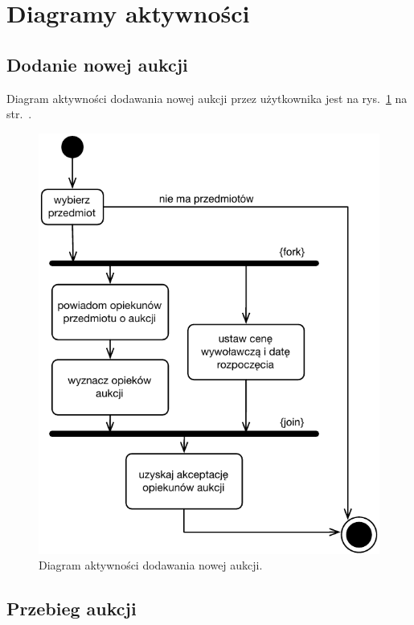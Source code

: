 \documentclass[10pt,a4paper]{article}
\begin{document}
\newpage
\section{Diagramy aktywności}

\subsection{Dodanie nowej aukcji}

Diagram aktywności dodawania nowej aukcji przez użytkownika jest na
rys.~\ref{fig:aktywnosc_nowa_aukcja} na
str.~\pageref{fig:aktywnosc_nowa_aukcja}.

\begin{figure}[ht]
  \begin{adjustwidth}{-2cm}{-2cm}
    \centering
    \includegraphics{figury/aktywnosc-nowa-aukcja}
    \caption{Diagram aktywności dodawania nowej aukcji.}
    \label{fig:aktywnosc_nowa_aukcja}
  \end{adjustwidth}
\end{figure}

\subsection{Przebieg aukcji}
\end{document}
